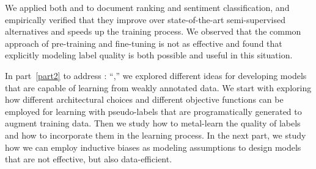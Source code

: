 We applied both \cws and \fwl to document ranking and sentiment classification, and empirically verified that they improve over state-of-the-art semi-supervised alternatives and speeds up the training process. We observed that the common approach of pre-training and fine-tuning is not as effective and found that explicitly modeling label quality is both possible and useful in this situation. 

\bigskip
In part~\ref{part2} to address \textbf{}: ``\emph{},'' we explored different ideas for developing models that are capable of learning from weakly annotated data. We start with exploring how different architectural choices and different objective functions can be employed for learning with pseudo-labels that are programatically generated to augment training data. Then we study how to metal-learn the quality of labels and how to incorporate them in the learning process.
%
In the next part, we study how we can employ inductive biases as modeling assumptions to design models that are not effective, but also data-efficient.